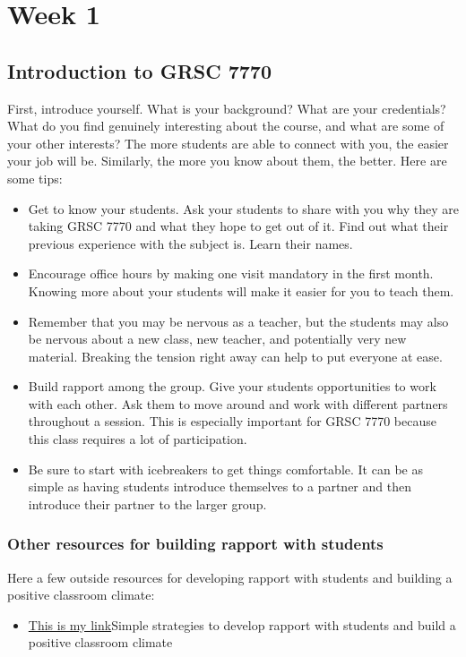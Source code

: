\section{Week 1}
\label{sec:week-1}

\subsection{Introduction to GRSC 7770}
\label{sec:intr-grsc-7770}

First, introduce yourself. What is your background? What are your credentials? What do you find genuinely interesting about the course, and what are some of your other interests? The more students are able to connect with you, the easier your job will be. Similarly, the more you know about them, the better.  Here are some tips:

\begin{itemize}
\item Get to know your students. Ask your students to share with you why they are taking GRSC 7770 and what they hope to get out of it. Find out what their previous experience with the subject is. Learn their names. 
\item Encourage office hours by making one visit mandatory in the first month. Knowing more about your students will make it easier for you to teach them. 
\item Remember that you may be nervous as a teacher, but the students may also be nervous about a new class, new teacher, and potentially very new material. Breaking the tension right away can help to put everyone at ease.
\item Build rapport among the group.  Give your students opportunities to work with each other. Ask them to move around and work with different partners throughout a session.  This is especially important for GRSC 7770 because this class requires a lot of participation. 
\item Be sure to start with icebreakers to get things comfortable. It can be as simple as having students introduce themselves to a partner and then introduce their partner to the larger group.
\end{itemize}

\subsubsection{Other resources for building rapport with students}
\label{sec:other-reso-build}

Here a few outside resources for developing rapport with students and building a positive classroom climate:
\begin{itemize}
\item \href{run:/Lectures/Week-1/BuildingRapport.pdf}{This is my link}Simple strategies to develop rapport with students and build a positive classroom climate
\end{itemize}


